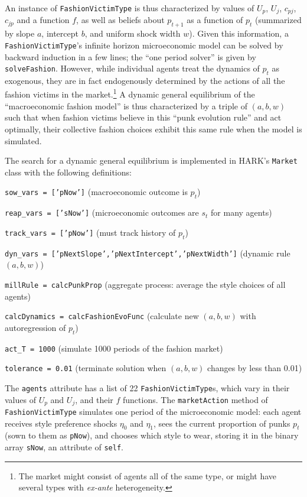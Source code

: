 \documentclass[12pt,titlepage,letterpaper]{econtex}
\begin{document}
An instance of \texttt{FashionVictimType} is thus characterized by values of $U_p$, $U_j$, $c_{pj}$, $c_{jp}$ and a function $f$, as well as beliefs about $p_{t+1}$ as a function of $p_t$ (summarized by slope $a$, intercept $b$, and uniform shock width $w$).  Given this information, a \texttt{FashionVictimType}'s infinite horizon microeconomic model can be solved by backward induction in a few lines; the ``one period solver'' is given by \texttt{solveFashion}.  However, while individual agents treat the dynamics of $p_t$ as exogenous, they are in fact endogenously determined by the actions of all the fashion victims in the market.\footnote{The market might consist of agents all of the same type, or might have several types with \textit{ex-ante} heterogeneity.}  A dynamic general equilibrium of the ``macroeconomic fashion model'' is thus characterized by a triple of $(a,b,w)$ such that when fashion victims believe in this ``punk evolution rule'' and act optimally, their collective fashion choices exhibit this same rule when the model is simulated.

The search for a dynamic general equilibrium is implemented in HARK's \texttt{Market} class with the following definitions:

\vspace{0.25cm}

\noindent \texttt{sow\_vars      = ['pNow']} (macroeconomic outcome is $p_t$)

\noindent \texttt{reap\_vars     = ['sNow']} (microeconomic outcomes are $s_t$ for many agents)

\noindent \texttt{track\_vars    = ['pNow']} (must track history of $p_t$)

\noindent \texttt{dyn\_vars      = ['pNextSlope','pNextIntercept','pNextWidth']} (dynamic rule $(a,b,w)$)

\noindent \texttt{millRule      = calcPunkProp} (aggregate process: average the style choices of all agents)

\noindent \texttt{calcDynamics  = calcFashionEvoFunc} (calculate new $(a,b,w)$ with autoregression of $p_t$)

\noindent \texttt{act\_T         = 1000} (simulate 1000 periods of the fashion market)

\noindent \texttt{tolerance     = 0.01} (terminate solution when $(a,b,w)$ changes by less than 0.01)

\vspace{0.25cm}

The \texttt{agents} attribute has a list of 22 \texttt{FashionVictimType}s, which vary in their values of $U_p$ and $U_j$, and their $f$ functions.  The \texttt{marketAction} method of \texttt{FashionVictimType} simulates one period of the microeconomic model: each agent receives style preference shocks $\eta_0$ and $\eta_1$, sees the current proportion of punks $p_t$ (sown to them as \texttt{pNow}), and chooses which style to wear, storing it in the binary array \texttt{sNow}, an attribute of \texttt{self}.
\end{document}
